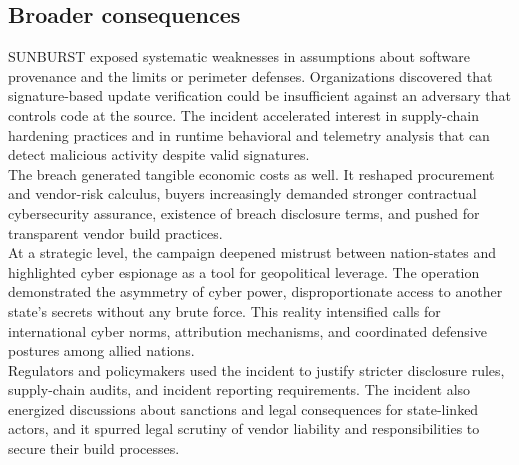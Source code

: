 \documentclass[conference]{IEEEtran}
\begin{document}
\subsection{Broader consequences}
SUNBURST exposed systematic weaknesses in assumptions about software provenance and the limits or perimeter defenses. Organizations discovered
that signature-based update verification could be insufficient against an adversary that controls code at the source. The incident accelerated
interest in supply-chain hardening practices and in runtime behavioral and telemetry analysis that can detect malicious activity despite valid 
signatures.\\
The breach generated tangible economic costs as well. It reshaped procurement and vendor-risk calculus, buyers increasingly demanded stronger
contractual cybersecurity assurance, existence of breach disclosure terms, and pushed for transparent vendor build practices.\\
At a strategic level, the campaign deepened mistrust between nation-states and highlighted cyber espionage as a tool for geopolitical leverage.
The operation demonstrated the asymmetry of cyber power, disproportionate access to another state's secrets without any brute force. This reality
intensified calls for international cyber norms, attribution mechanisms, and coordinated defensive postures among allied nations.\\
Regulators and policymakers used the incident to justify stricter disclosure rules, supply-chain audits, and incident reporting requirements\cite{NCSC2021FurtherTTPsSVR}.
The incident also energized discussions about sanctions and legal consequences for state-linked actors, and it spurred legal scrutiny of vendor liability
and responsibilities to secure their build processes.
\end{document}
